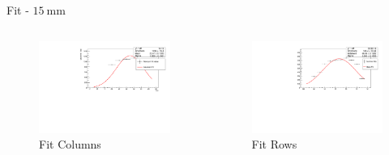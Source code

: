 \begin{frame}{ Fit - $\SI{15}{\milli\meter}$ }

  \begin{columns}

   \begin{column}{0.48\textwidth}
     \begin{figure}
       \centering
       \includegraphics[width=1.05\textwidth]{./15_mm_erorbar_plot_col.pdf}
       \caption{ Fit Columns }
       \label{ fig: iv_curve_theoretical}
     \end{figure}
   \end{column}

   \begin{column}{0.48\textwidth}
     \begin{figure}
       \centering
       \includegraphics[width=1.05\textwidth]{./15_mm_erorbar_plot_row.pdf}
       \caption{ Fit Rows }
       \label{ fig: iv_curve_measured}
     \end{figure}
   \end{column}

  \end{columns}

\end{frame}


